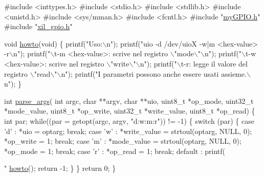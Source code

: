 \begin{DoxyCodeInclude}

\textcolor{preprocessor}{#include <inttypes.h>}
\textcolor{preprocessor}{#include <stdio.h>}
\textcolor{preprocessor}{#include <stdlib.h>}
\textcolor{preprocessor}{#include <unistd.h>}
\textcolor{preprocessor}{#include <sys/mman.h>}
\textcolor{preprocessor}{#include <fcntl.h>}
\textcolor{preprocessor}{#include "\hyperlink{my_g_p_i_o_8h}{myGPIO.h}"}
\textcolor{preprocessor}{#include "\hyperlink{xil__gpio_8h}{xil\_gpio.h}"}

\textcolor{keywordtype}{void} \hyperlink{uio-int_8c_a05909651fa170a63e98e3f8e13451b7b}{howto}(\textcolor{keywordtype}{void}) \{
    printf(\textcolor{stringliteral}{"Uso:\(\backslash\)n"});
    printf(\textcolor{stringliteral}{"uio -d /dev/uioX -w|m <hex-value> -r\(\backslash\)n"});
    printf(\textcolor{stringliteral}{"\(\backslash\)t-m <hex-value>: scrive nel registro \(\backslash\)"mode\(\backslash\)"\(\backslash\)n"});
    printf(\textcolor{stringliteral}{"\(\backslash\)t-w <hex-value>: scrive nel registro \(\backslash\)"write\(\backslash\)"\(\backslash\)n"});
    printf(\textcolor{stringliteral}{"\(\backslash\)t-r: legge il valore del registro \(\backslash\)"read\(\backslash\)"\(\backslash\)n"});
    printf(\textcolor{stringliteral}{"I parametri possono anche essere usati assieme.\(\backslash\)n"});
\}


\textcolor{keywordtype}{int} \hyperlink{uio-int_8c_ab6b18eb1bf7bc996599c06dc6dad8f53}{parse\_args}(   \textcolor{keywordtype}{int}         argc,
                \textcolor{keywordtype}{char}        **argv,
                \textcolor{keywordtype}{char}        **uio,
                uint8\_t     *op\_mode,
                uint32\_t    *mode\_value,
                uint8\_t     *op\_write,
                uint32\_t    *write\_value,
                uint8\_t     *op\_read)
\{
    \textcolor{keywordtype}{int} par;
    \textcolor{keywordflow}{while}((par = getopt(argc, argv, \textcolor{stringliteral}{"d:w:m:r"})) != -1) \{
        \textcolor{keywordflow}{switch} (par) \{
        \textcolor{keywordflow}{case} \textcolor{charliteral}{'d'} :
            *uio = optarg;
            \textcolor{keywordflow}{break};
        \textcolor{keywordflow}{case} \textcolor{charliteral}{'w'} :
            *write\_value = strtoul(optarg, NULL, 0);
            *op\_write = 1;
            \textcolor{keywordflow}{break};
        \textcolor{keywordflow}{case} \textcolor{charliteral}{'m'} :
            *mode\_value = strtoul(optarg, NULL, 0);
            *op\_mode = 1;
            \textcolor{keywordflow}{break};
        \textcolor{keywordflow}{case} \textcolor{charliteral}{'r'} :
            *op\_read = 1;
            \textcolor{keywordflow}{break};
        \textcolor{keywordflow}{default} :
            printf(\textcolor{stringliteral}{"%
            \hyperlink{uio-int_8c_a05909651fa170a63e98e3f8e13451b7b}{howto}();
            \textcolor{keywordflow}{return} -1;
        \}
    \}
    \textcolor{keywordflow}{return} 0;
\}


}
\end{DoxyCodeInclude}
